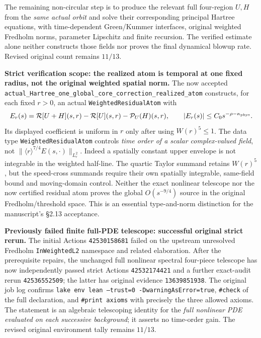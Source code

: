 \documentclass[11pt]{amsart}
\begin{document}
The remaining non-circular step is to produce the relevant
full four-region $U,H$ from the \emph{same actual orbit} and
solve their corresponding principal Hartree equations, with
time-dependent Green/Kummer interfaces, original weighted
Fredholm norms, parameter Lipschitz and finite recursion.
The verified estimate alone neither constructs those fields
nor proves the final dynamical blowup rate. Revised original
count remains $11/13$.



\medskip
\noindent\textbf{Strict verification scope: the realized atom is
temporal at one fixed radius, not the original weighted spatial norm.}
The now accepted
\texttt{actual\_Hartree\_one\_global\_core\_correction\_realized\_atom}
constructs, for each fixed \(r>0\), an actual
\texttt{WeightedResidualAtom} with
\[
 E_r(s)=\mathcal R[U+H](s,r)-\mathcal R[U](s,r)
       -\mathcal P_U(H)(s,r),\qquad
 |E_r(s)|\le C_0s^{-\rho-\kappa_{\rm phys}}.
\]
Its displayed coefficient is uniform in \(r\) only after
using \(W(r)^5\le1\).  The data type
\texttt{WeightedResidualAtom} controls \emph{time order of a
scalar complex-valued field}, not
\(\|\langle r\rangle^{7/4}E(s,\cdot)\|_{L^2_r}\).
Indeed a spatially constant upper envelope is not integrable
in the weighted half-line.  The quartic Taylor summand retains
\(W(r)^5\), but the speed-cross summands require their own
spatially integrable, same-field bound and moving-domain
control.  Neither the exact nonlinear telescope nor the
now certified residual atom proves the global
\(O(s^{-9/4})\) source in the original Fredholm/threshold
space.  This is an essential type-and-norm distinction for
the manuscript's \S2.13 acceptance.

\medskip
\noindent\textbf{Previously failed finite full-PDE telescope:
successful original strict rerun.}
The initial Actions \texttt{42530158681} failed on the
upstream unresolved Fredholm
\texttt{InWeightedL2} namespace and related elaboration.
After the prerequisite repairs, the unchanged full
nonlinear spectral four-piece telescope has now
independently passed strict Actions \texttt{42532174421}
and a further exact-audit rerun \texttt{42536552509};
the latter has original evidence \texttt{13639851938}.
The original job log confirms
\texttt{lake env lean --trust=0 -DwarningAsError=true},
\texttt{\#check} of the full declaration, and
\texttt{\#print axioms} with precisely the three allowed
axioms.  The statement is an algebraic telescoping
identity for the \emph{full nonlinear PDE evaluated on each
successive background}; it asserts no time-order gain.
The revised original environment tally remains \(11/13\).
\end{document}
